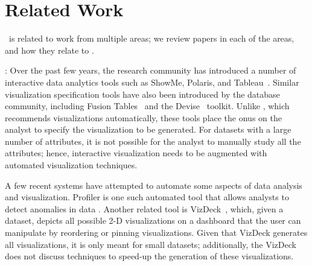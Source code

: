 

\section{Related Work}
\label{sec:related_work}
\SeeDB\ is related to work from multiple areas;
we review papers in each of the areas, and how they relate to
\SeeDB. 

:
Over the past few years, the research community has introduced a number of
interactive data analytics tools such as ShowMe, Polaris, and 
Tableau~\cite{DBLP:journals/cacm/StolteTH08, DBLP:journals/tvcg/MackinlayHS07}.
Similar visualization specification tools have also been introduced by the
database community, including Fusion
Tables~\cite{DBLP:conf/sigmod/GonzalezHJLMSSG10} and the
Devise~\cite{DBLP:conf/sigmod/LivnyRBCDLMW97} toolkit. 
Unlike \SeeDB, which recommends visualizations automatically, these tools place
the onus on the analyst to specify the visualization to be generated.
For datasets with a large number of attributes, it is not possible
for the analyst to manually study all the attributes; hence, interactive
visualization needs to be augmented with automated visualization techniques.

A few recent systems have attempted to automate some aspects of data analysis
and visualization. Profiler is one such automated tool that allows analysts to
detect anomalies in data \cite{DBLP:conf/AVI/KandelPPHH12}.
Another related tool 
is VizDeck~\cite{DBLP:conf/sigmod/KeyHPA12}, which, given a dataset,
depicts all possible 2-D visualizations on a dashboard that the user can
manipulate by reordering or pinning visualizations.
Given that VizDeck generates all visualizations, it is only meant for 
small datasets; additionally, the VizDeck does not discuss techniques
to speed-up the generation of these visualizations. 

